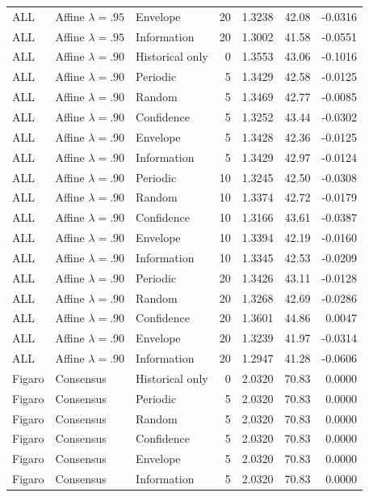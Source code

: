 \begin{longtable}{lllrrrr}
ALL & Affine $\lambda=.95$ & Envelope & 20 & 1.3238 & 42.08 & -0.0316 \\
ALL & Affine $\lambda=.95$ & Information & 20 & 1.3002 & 41.58 & -0.0551 \\
ALL & Affine $\lambda=.90$ & Historical only & 0 & 1.3553 & 43.06 & -0.1016 \\
ALL & Affine $\lambda=.90$ & Periodic & 5 & 1.3429 & 42.58 & -0.0125 \\
ALL & Affine $\lambda=.90$ & Random & 5 & 1.3469 & 42.77 & -0.0085 \\
ALL & Affine $\lambda=.90$ & Confidence & 5 & 1.3252 & 43.44 & -0.0302 \\
ALL & Affine $\lambda=.90$ & Envelope & 5 & 1.3428 & 42.36 & -0.0125 \\
ALL & Affine $\lambda=.90$ & Information & 5 & 1.3429 & 42.97 & -0.0124 \\
ALL & Affine $\lambda=.90$ & Periodic & 10 & 1.3245 & 42.50 & -0.0308 \\
ALL & Affine $\lambda=.90$ & Random & 10 & 1.3374 & 42.72 & -0.0179 \\
ALL & Affine $\lambda=.90$ & Confidence & 10 & 1.3166 & 43.61 & -0.0387 \\
ALL & Affine $\lambda=.90$ & Envelope & 10 & 1.3394 & 42.19 & -0.0160 \\
ALL & Affine $\lambda=.90$ & Information & 10 & 1.3345 & 42.53 & -0.0209 \\
ALL & Affine $\lambda=.90$ & Periodic & 20 & 1.3426 & 43.11 & -0.0128 \\
ALL & Affine $\lambda=.90$ & Random & 20 & 1.3268 & 42.69 & -0.0286 \\
ALL & Affine $\lambda=.90$ & Confidence & 20 & 1.3601 & 44.86 & 0.0047 \\
ALL & Affine $\lambda=.90$ & Envelope & 20 & 1.3239 & 41.97 & -0.0314 \\
ALL & Affine $\lambda=.90$ & Information & 20 & 1.2947 & 41.28 & -0.0606 \\
Figaro & Consensus & Historical only & 0 & 2.0320 & 70.83 & 0.0000 \\
Figaro & Consensus & Periodic & 5 & 2.0320 & 70.83 & 0.0000 \\
Figaro & Consensus & Random & 5 & 2.0320 & 70.83 & 0.0000 \\
Figaro & Consensus & Confidence & 5 & 2.0320 & 70.83 & 0.0000 \\
Figaro & Consensus & Envelope & 5 & 2.0320 & 70.83 & 0.0000 \\
Figaro & Consensus & Information & 5 & 2.0320 & 70.83 & 0.0000 \\

\end{longtable}

